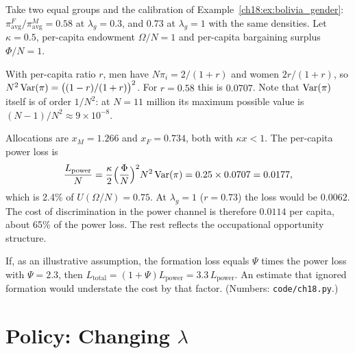\documentclass[../structural_economics_book.tex]{subfiles}
\begin{document}
\begin{example}\label{ch18:ex:cost}
Take two equal groups and the calibration of Example~\ref{ch18:ex:bolivia_gender}: $\pi^F_{\text{avg}}/\pi^M_{\text{avg}} = 0.58$ at $\lambda_g = 0.3$, and $0.73$ at $\lambda_g = 1$ with the same densities. Let $\kappa = 0.5$, per-capita endowment $\Omega/N = 1$ and per-capita bargaining surplus $\Phi/N = 1$.

With per-capita ratio $r$, men have $N\pi_i = 2/(1+r)$ and women $2r/(1+r)$, so $N^2\operatorname{Var}(\pi) = \big((1-r)/(1+r)\big)^2$. For $r = 0.58$ this is $0.0707$. Note that $\operatorname{Var}(\pi)$ itself is of order $1/N^2$: at $N = 11$ million its maximum possible value is $(N-1)/N^2 \approx 9 \times 10^{-8}$.

Allocations are $x_M = 1.266$ and $x_F = 0.734$, both with $\kappa x < 1$. The per-capita power loss is
\[
\frac{L_{\text{power}}}{N} = \frac{\kappa}{2}\Big(\frac{\Phi}{N}\Big)^2 N^2 \operatorname{Var}(\pi) = 0.25 \times 0.0707 = 0.0177,
\]
which is 2.4\% of $U(\Omega/N) = 0.75$. At $\lambda_g = 1$ ($r = 0.73$) the loss would be $0.0062$. The cost of discrimination in the power channel is therefore $0.0114$ per capita, about 65\% of the power loss. The rest reflects the occupational opportunity structure.

If, as an illustrative assumption, the formation loss equals $\Psi$ times the power loss with $\Psi = 2.3$, then $L_{\text{total}} = (1 + \Psi)L_{\text{power}} = 3.3\,L_{\text{power}}$. An estimate that ignored formation would understate the cost by that factor. (Numbers: \texttt{code/ch18.py}.)
\end{example}


\section{Policy: Changing $\lambda$}
\label{ch18:sec:policy}
\end{document}
